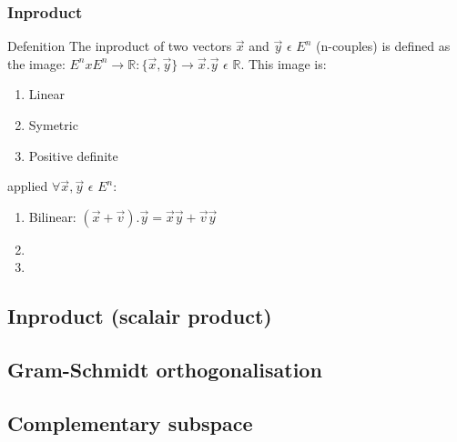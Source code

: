\begin{frame}
	\frametitle{Inproduct}
	\begin{block}{Defenition}
		The inproduct of two vectors $\overrightarrow{x}$ and $\overrightarrow{y}$ $\epsilon$ $E^n$ (n-couples) is defined as the image: $E^nxE^n\to\mathbb{R}:\{\overrightarrow{x},\overrightarrow{y}\}\to\overrightarrow{x}.\overrightarrow{y}$ $\epsilon$ $\mathbb{R}$. This image is:
		\begin{enumerate}
			\item Linear
			\item Symetric
			\item Positive definite
		\end{enumerate}
	\end{block}
	\begin{block}{applied}
		$\forall \overrightarrow{x},\overrightarrow{y}$ $\epsilon$ $E^n$:
		\begin{enumerate}
			\item Bilinear: $(\overrightarrow{x}+\overrightarrow{v}).\overrightarrow{y}=\overrightarrow{x}\overrightarrow{y}+\overrightarrow{v}\overrightarrow{y}$
			\item
			\item
		\end{enumerate}
	\end{block} 
\end{frame}


	\subsection{Inproduct (scalair product)}
	\subsection{Gram-Schmidt orthogonalisation}
	\subsection{Complementary subspace}
	
	




